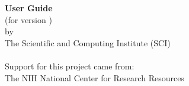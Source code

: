 %
%
%
%
%
%

\begin{center}
  \vspace*{1.5in}
  {\huge\bf \sr{} User Guide}\\
  {(for \sr{} version \version{})} \\
  \vspace{0.75in}
  {\Large
    by \\
    The Scientific and Computing Institute (SCI)\\
    \\
    \bigskip
    \vfill
    Support for this project came from:\\
    \smallskip
    The NIH National Center for Research Resources  
    }
\end{center}

